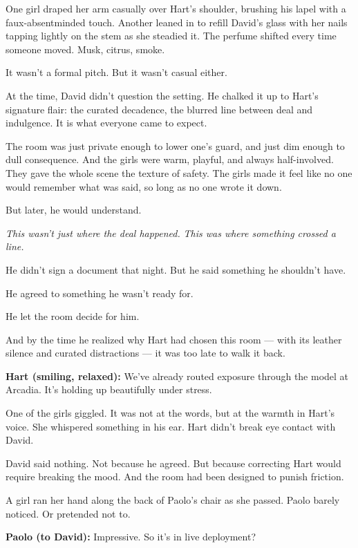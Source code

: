 \medskip


One girl draped her arm casually over Hart’s shoulder, brushing his lapel with a faux-absentminded touch.  
Another leaned in to refill David’s glass with her nails tapping lightly on the stem as she steadied it.  
The perfume shifted every time someone moved. Musk, citrus, smoke.  

It wasn’t a formal pitch. But it wasn’t casual either.

At the time, David didn’t question the setting.  
He chalked it up to Hart’s signature flair: the curated decadence, the blurred line between deal and indulgence.
It is what everyone came to expect.  

The room was just private enough to lower one’s guard, and just dim enough to dull consequence.  
And the girls were warm, playful, and always half-involved. 
They gave the whole scene the texture of safety.  
The girls made it feel like no one would remember what was said, so long as no one wrote it down.

But later, he would understand.

\textit{This wasn’t just where the deal happened.}  
\textit{This was where something crossed a line.}

He didn’t sign a document that night.  
But he said something he shouldn’t have.  

He agreed to something he wasn’t ready for.  

He let the room decide for him.

And by the time he realized why Hart had chosen this room —  
with its leather silence and curated distractions —  
it was too late to walk it back.


\textbf{Hart (smiling, relaxed):}  
We’ve already routed exposure through the model at Arcadia.  
It’s holding up beautifully under stress.

One of the girls giggled. It was not at the words, but at the warmth in Hart’s voice. She whispered something in his ear.  
Hart didn’t break eye contact with David.

David said nothing. Not because he agreed. But because correcting Hart would require breaking the mood.  
And the room had been designed to punish friction.

A girl ran her hand along the back of Paolo’s chair as she passed. Paolo barely noticed. Or pretended not to.

\textbf{Paolo (to David):}  
Impressive.  
So it’s in live deployment?

